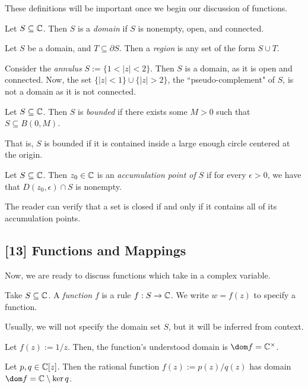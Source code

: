 \documentclass{article}
\begin{document}
These definitions will be important once we begin our discussion of functions.
\begin{definition}
Let $S\subseteq\mathbb C$. Then $S$ is a \textit{domain} if $S$ is nonempty, open, and connected.
\end{definition}
\begin{definition}
Let $S$ be a domain, and $T\subseteq \partial S$. Then a \textit{region} is any set of the form $S\cup T$.
\end{definition}
\begin{example}
Consider the \textit{annulus} $S := \{1 < |z| < 2\}$. Then $S$ is a domain, as it is open and connected. Now, the set $\{|z|<1\} \cup \{|z| > 2\}$, the ``pseudo-complement" of $S$, is not a domain as it is not connected.
\end{example}
\begin{definition}
Let $S\subseteq \mathbb C$. Then $S$ is \textit{bounded} if there exists some $M>0$ such that $S\subseteq B(0, M)$.
\end{definition}
That is, $S$ is bounded if it is contained inside a large enough circle centered at the origin.
\begin{definition}
Let $S\subseteq \mathbb C$. Then $z_0\in\mathbb C$ is an \textit{accumulation point of $S$} if for every $\epsilon > 0$, we have that $D(z_0, \epsilon)\cap S$ is nonempty.
\end{definition}

The reader can verify that a set is closed if and only if it contains all of its accumulation points.
\newpage
\subsection*{[13] Functions and Mappings}
Now, we are ready to discuss functions which take in a complex variable.
\begin{definition}
Take $S\subseteq \mathbb C$. A \textit{function} $f$ is a rule $f: S\to\mathbb C$. We write $w = f(z)$ to specify a function.
\end{definition}
Usually, we will not specify the domain set $S$, but it will be inferred from context.
\begin{example}
Let $f(z) := 1/z$. Then, the function's understood domain is $\dom f = \C^\times$.
\end{example}
\begin{example}
Let $p,q\in\mathbb C[z]$. Then the rational function $f(z) := p(z)/q(z)$ has domain $\dom f = \C\setminus \ker q$.
\end{example}
\end{document}
